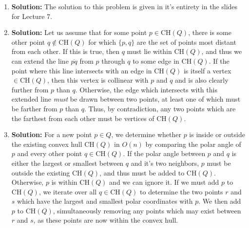 \documentclass{article}
\begin{document}
\begin{enumerate}
    \item \textbf{Solution:}
    The solution to this problem is given in it's entirety in the slides for
    Lecture 7.

    \item \textbf{Solution:}
    Let us assume that for some point $p \in \text{CH}(Q)$, there is some other
    point $q \not\in \text{CH}(Q)$ for which $\{p,q\}$ are the set of points
    most distant from each other. If this is true, then $q$ must lie within
    $\text{CH}(Q)$, and thus we can extend the line $\overline{pq}$ from $p$ through
    $q$ to some edge in $\text{CH}(Q)$. If the point where this line intersects
    with an edge in $\text{CH}(Q)$ is itself a vertex $\in \text{CH}(Q)$, then
    this vertex is collinear with $p$ and $q$ and is also clearly further from
    $p$ than $q$. Otherwise, the edge which intersects with this extended line
    \emph{must} be drawn between two points, at least one of which must be
    farther from $p$ than $q$. Thus, by contradiction, any two points which are
    the farthest from each other must be vertices of $\text{CH}(Q)$.

    \item \textbf{Solution:}
    For a new point $p \in Q$, we determine whether $p$ is inside or outside the
    existing convex hull $\text{CH}(Q)$ in $O(n)$ by comparing the polar
    angle of $p$ and every other point $q \in \text{CH}(Q)$. If the polar angle
    between $p$ and $q$ is either the largest or smallest between $q$ and it's
    two neighbors, $p$ must be outside the existing $\text{CH}(Q)$, and thus
    must be added to $\text{CH}(Q)$. Otherwise, $p$ is within $\text{CH}(Q)$ and
    we can ignore it. If we must add $p$ to $\text{CH}(Q)$, we iterate over all
    $q \in \text{CH}(Q)$ to determine the two points $r$ and $s$ which have the
    largest and smallest polar coordinates with $p$. We then add $p$ to
    $\text{CH}(Q)$, simultaneously removing any points which may exist between
    $r$ and $s$, as these points are now within the convex hull.


\end{enumerate}
\end{document}
